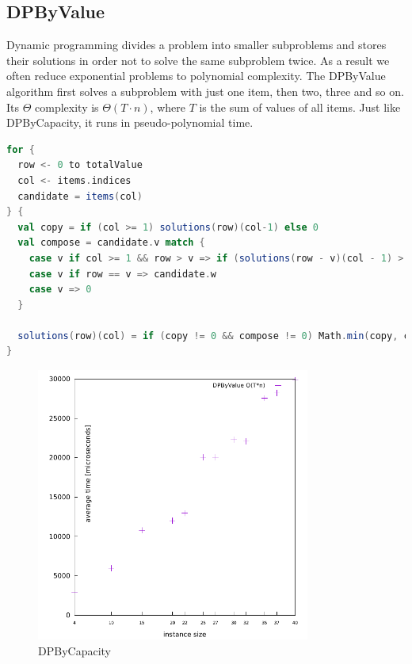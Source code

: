 \documentclass[a4paper,10pt,twocolumn]{article}
\begin{document}
\subsection{DPByValue}\label{DPByValue}
Dynamic programming divides a problem into smaller subproblems and stores their solutions in order not to solve the same
subproblem twice. As a result we often reduce exponential problems to polynomial complexity. The DPByValue algorithm
first solves a subproblem with just one item, then two, three and so on. Its $\Theta$ complexity is
$\Theta(T \cdot n)$, where $T$ is the sum of values of all items. Just like DPByCapacity, it runs in pseudo-polynomial
time.

\begin{lstlisting}[frame=tlrb,language=scala,basicstyle=\scriptsize,label=dpByValueCode,caption=DPByValue]
for {
  row <- 0 to totalValue
  col <- items.indices
  candidate = items(col)
} {
  val copy = if (col >= 1) solutions(row)(col-1) else 0
  val compose = candidate.v match {
    case v if col >= 1 && row > v => if (solutions(row - v)(col - 1) > 0) solutions(row - v)(col - 1) + candidate.w else 0
    case v if row == v => candidate.w
    case v => 0
  }

  solutions(row)(col) = if (copy != 0 && compose != 0) Math.min(copy, compose) else Math.max(copy, compose)
}
\end{lstlisting}

\begin{figure}[H]
  \begin{center}
    \hspace*{-0.5cm}\includegraphics[width=9cm,height=9cm]{gnuplot/pdf/DPByValue.pdf}
  \end{center}
  \caption{DPByCapacity}\label{dpByCapacityPlot}
\end{figure}
\end{document}
